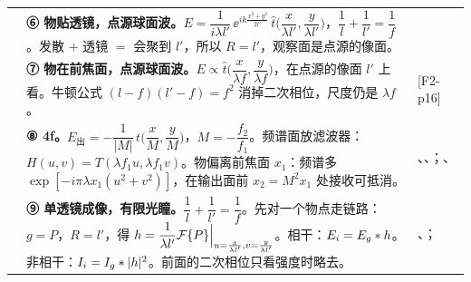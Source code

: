 \begin{longtable}{@{}P{3.3cm}P{9.9cm}P{3.0cm}@{}}
& \textbf{⑥ 物贴透镜，点源球面波。}$E=\dfrac{1}{i\lambda l'}\,\ee^{ik\frac{x^2+y^2}{2l'}}\,\hat t\Big(\dfrac{x}{\lambda l'},\dfrac{y}{\lambda l'}\Big)$，$\dfrac1l+\dfrac1{l'}=\dfrac1f$。\newline 发散 $+$ 透镜 $=$ 会聚到 $l'$，所以 $R=l'$，观察面是点源的像面。
& \pageref{sec:sphericalillum}\\ \addlinespace
{}
& \textbf{⑦ 物在前焦面，点源球面波。}$E\propto\hat t\Big(\dfrac{x}{\lambda f},\dfrac{y}{\lambda f}\Big)$，在点源的像面 $l'$ 上看。\newline 牛顿公式 $(l-f)(l'-f)=f^2$ 消掉二次相位，尺度仍是 $\lambda f$。
& \pageref{sec:lensFT} [F2-p16]\\ \addlinespace
{}
& \textbf{⑧ 4f。}$E_{\text{出}}=-\dfrac1{|M|}\,t\Big(\dfrac xM,\dfrac yM\Big)$，$M=-\dfrac{f_2}{f_1}$。频谱面放滤波器：$H(u,v)=T(\lambda f_1u,\lambda f_1v)$。\newline 物偏离前焦面 $x_1$：频谱多 $\exp[-i\pi\lambda x_1(u^2+v^2)]$，在输出面前 $x_2=M^2x_1$ 处接收可抵消。
& \pageref{ex:v-4f2}、\pageref{ex:v-4fshift}、\pageref{ex:v-alvarez}；\pageref{sec:4f}、\pageref{sec:4foffset}\\ \addlinespace
{}
& \textbf{⑨ 单透镜成像，有限光瞳。}$\dfrac1l+\dfrac1{l'}=\dfrac1f$。先对一个物点走链路：$g=P$，$R=l'$，得 $h=\dfrac{1}{\lambda l'}\mathcal{F}\{P\}\Big|_{u=\frac{x}{\lambda l'},v=\frac{y}{\lambda l'}}$。\newline 相干：$E_i=E_g\ast h$。非相干：$I_i=I_g\ast|h|^2$。前面的二次相位只看强度时略去。
& \pageref{ex:v-mtf}、\pageref{ex:v-3slit}；\pageref{sec:waveimg}\\
\bottomrule
\end{longtable}
\endgroup

